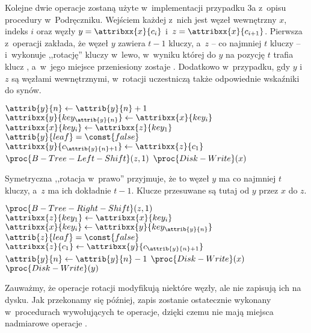 Kolejne dwie operacje zostaną użyte w~implementacji przypadku 3a z~opisu procedury w~Podręczniku.
Wejściem każdej z~nich jest węzeł wewnętrzny $x$, indeks $i$ oraz węzły $y=\attribxx{x}{c_i}$ i~$z=\attribxx{x}{c_{i+1}}$.
Pierwsza z~operacji zakłada, że węzeł $y$ zawiera $t-1$ kluczy, a~$z$ -- co najmniej $t$ kluczy -- i~wykonuje ,,rotację'' kluczy w~lewo, w~wyniku której do $y$ na pozycję $t$ trafia klucz , a~w~jego miejsce przeniesiony zostaje .
Dodatkowo w~przypadku, gdy $y$ i~$z$ są węzłami wewnętrznymi, w~rotacji uczestniczą także odpowiednie wskaźniki do synów.
\begin{codebox}
    \li $\attrib{y}{n}\gets\attrib{y}{n}+1$
    \li $\attribxx{y}{key_{\attrib{y}{n}}}\gets\attribxx{x}{key_i}$
    \li $\attribxx{x}{key_i}\gets\attribxx{z}{key_1}$
    \li \If $\attrib{y}{leaf}=\const{false}$
    \li     \Then $\attribxx{y}{c_{\attrib{y}{n}+1}}\gets\attribxx{z}{c_1}$
            \End
    \li $\proc{B-Tree-Left-Shift}(z,1)$
    \li $\proc{Disk-Write}(x)$
\end{codebox}
Symetryczna ,,rotacja w~prawo'' przyjmuje, że to węzeł $y$ ma co najmniej $t$ kluczy, a~$z$ ma ich dokładnie $t-1$.
Klucze przesuwane są tutaj od $y$ przez $x$ do $z$.
\begin{codebox}
    \li $\proc{B-Tree-Right-Shift}(z,1)$
    \li $\attribxx{z}{key_1}\gets\attribxx{x}{key_i}$
    \li $\attribxx{x}{key_i}\gets\attribxx{y}{key_{\attrib{y}{n}}}$
    \li \If $\attrib{z}{leaf}=\const{false}$
    \li     \Then $\attribxx{z}{c_1}\gets\attribxx{y}{c_{\attrib{y}{n}+1}}$
            \End
    \li $\attrib{y}{n}\gets\attrib{y}{n}-1$
    \li $\proc{Disk-Write}(x)$
    \li $\proc{Disk-Write}(y)$
\end{codebox}
Zauważmy, że operacje rotacji modyfikują niektóre węzły, ale nie zapisują ich na dysku.
Jak przekonamy się później, zapis zostanie ostatecznie wykonany w~procedurach wywołujących te operacje, dzięki czemu nie mają miejsca nadmiarowe operacje .

